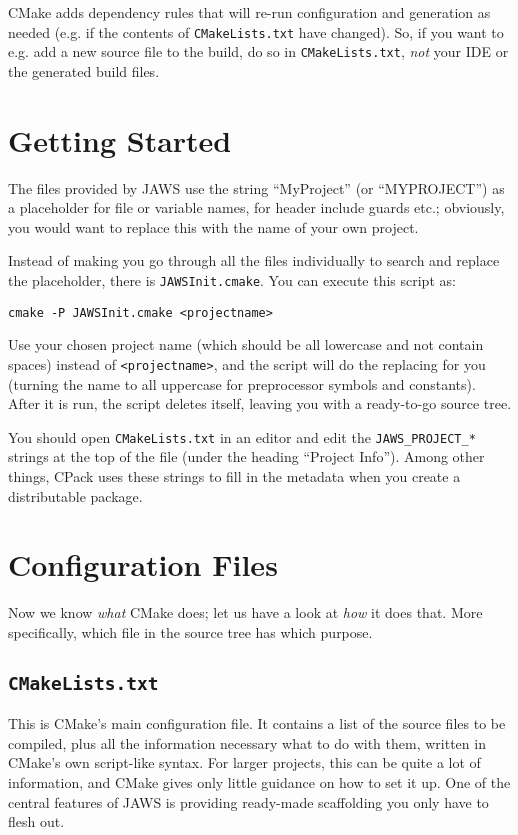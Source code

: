 CMake adds dependency rules that will re-run configuration and generation as needed (e.g. if the contents of \lstinline{CMakeLists.txt} have changed). So, if you want to e.g. add a new source file to the build, do so in \lstinline{CMakeLists.txt}, \emph{not} your IDE or the generated build files.

\section{Getting Started}

The files provided by JAWS use the string ``MyProject'' (or ``MYPROJECT'') as a placeholder for file or variable names, for header include guards etc.; obviously, you would want to replace this with the name of your own project.

Instead of making you go through all the files individually to search and replace the placeholder, there is \lstinline{JAWSInit.cmake}. You can execute this script as:

\begin{lstlisting}
cmake -P JAWSInit.cmake <projectname>
\end{lstlisting}

Use your chosen project name (which should be all lowercase and not contain spaces) instead of \lstinline{<projectname>}, and the script will do the replacing for you (turning the name to all uppercase for preprocessor symbols and constants). After it is run, the script deletes itself, leaving you with a ready-to-go source tree.

You should open \lstinline{CMakeLists.txt} in an editor and edit the \lstinline{JAWS_PROJECT_*} strings at the top of the file (under the heading ``Project Info''). Among other things, CPack uses these strings to fill in the metadata when you create a distributable package.

\section{Configuration Files}

Now we know \emph{what} CMake does; let us have a look at \emph{how} it does that. More specifically, which file in the source tree has which purpose.

\subsection{\texttt{CMakeLists.txt}}

This is CMake's main configuration file. It contains a list of the source files to be compiled, plus all the information necessary what to do with them, written in CMake's own script-like syntax. For larger projects, this can be quite a lot of information, and CMake gives only little guidance on how to set it up. One of the central features of JAWS is providing ready-made scaffolding you only have to flesh out.

